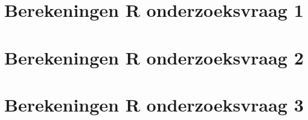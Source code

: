 \documentclass{bachproef-tin}
\begin{document}


\chapter{Berekeningen R onderzoeksvraag 1}
\label{bijlage:r-1}



\chapter{Berekeningen R onderzoeksvraag 2}
\label{bijlage:r-2}



\chapter{Berekeningen R onderzoeksvraag 3}
\label{bijlage:r-3}




\printbibliography[heading=bibintoc]
\end{document}

